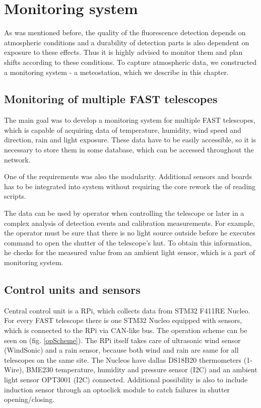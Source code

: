 
\chapter{Monitoring system}
As was mentioned before, the quality of the fluorescence detection depends on atmospheric conditions and a durability of detection parts is also dependent on exposure to these effects. Thus it is highly advised to monitor them and plan shifts according to these conditions. To capture atmospheric data, we constructed a monitoring system - a meteostation, which we describe in this chapter.
\section{Monitoring of multiple FAST telescopes}
The main goal was to develop a monitoring system for multiple FAST telescopes, which is capable of acquiring data of temperature, humidity, wind speed and direction, rain and light exposure. These data have to be easily accessible, so it is necessary to store them in some database, which can be accessed throughout the network.
\par
One of the requirements was also the modularity. Additional sensors and boards has to be integrated into system without requiring the core rework the of reading scripts.

\par
The data can be used by operator when controlling the telescope or later in a complex analysis of detection events and calibration measurements. For example, the operator must be sure that there is no light source outside before he executes command to open the shutter of the telescope's hut. To obtain this information, he checks for the measured value from an ambient light sensor, which is a part of monitoring system.
\par

\section{Control units and sensors}
Central control unit is a RPi, which collects data from STM32 F411RE Nucleo. For every FAST telescope there is one STM32 Nucleo equipped with sensors, which is connected to the RPi via CAN-like bus. The operation scheme can be seen on (fig. \ref{opScheme}). The RPi itself takes care of ultrasonic wind sensor (WindSonic) and a rain sensor, because both wind and rain are same for all telescopes on the same site. The Nucleos have dallas DS18B20 thermometers (1-Wire), BME230 temperature, humidity and pressure sensor (I2C) and an ambient light sensor OPT3001 (I2C) connected. Additional possibility is also to include induction sensor through an optoclick module to catch failures in shutter opening/closing.


